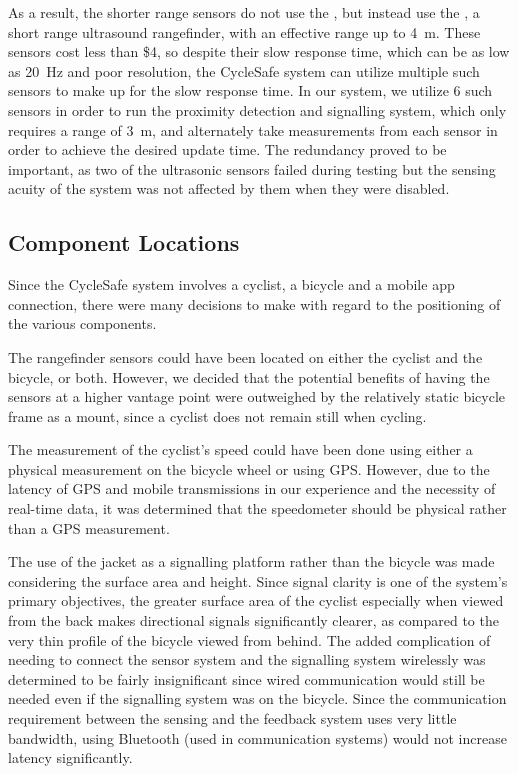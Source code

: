 \documentclass[journal]{IEEEtran}
\begin{document}
\label{sonar_tradeoff}
As a result, the shorter range sensors do not use the \lidar{}, but instead use the \sonar{}, a short range ultrasound rangefinder, with an effective range up to \SI{4}{\meter}. These sensors cost less than \$4, so despite their slow response time, which can be as low as \SI{20}{\Hz} and poor resolution, the CycleSafe system can utilize multiple such sensors to make up for the slow response time. In our system, we utilize 6 such sensors in order to run the proximity detection and signalling system, which only requires a range of \SI{3}{\meter}, and alternately take measurements from each sensor in order to achieve the desired update time. The redundancy proved to be important, as two of the ultrasonic sensors failed during testing but the sensing acuity of the system was not affected by them when they were disabled.

\subsection{Component Locations}

Since the CycleSafe system involves a cyclist, a bicycle and a mobile app connection, there were many decisions to make with regard to the positioning of the various components.

The rangefinder sensors could have been located on either the cyclist and the bicycle, or both. However, we decided that the potential benefits of having the sensors at a higher vantage point were outweighed by the relatively static bicycle frame as a mount, since a cyclist does not remain still when cycling.

The measurement of the cyclist's speed could have been done using either a physical measurement on the bicycle wheel or using GPS. However, due to the latency of GPS and mobile transmissions in our experience and the necessity of real-time data, it was determined that the speedometer should be physical rather than a GPS measurement.

The use of the jacket as a signalling platform rather than the bicycle was made considering the surface area and height. Since signal clarity is one of the system's primary objectives, the greater surface area of the cyclist especially when viewed from the back makes directional signals significantly clearer, as compared to the very thin profile of the bicycle viewed from behind. The added complication of needing to connect the sensor system and the signalling system wirelessly was determined to be fairly insignificant since wired communication would still be needed even if the signalling system was on the bicycle. Since the communication requirement between the sensing and the feedback system uses very little bandwidth, using Bluetooth (used in communication systems) would not increase latency significantly.
\end{document}
